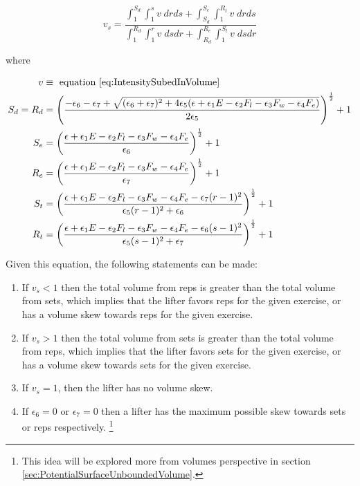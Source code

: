 \begin{minipage}{\textwidth}
	\begin{equation}
	   \label{eq:BasicSurfaceVolumeSkew}
	   v_s=\frac{
	   	\int_{1}^{S_d}\int_{1}^{s}v\;drds+
	   	\int_{S_d}^{S_e}\int_{1}^{R_t}v\;drds
	   }{
	   	\int_{1}^{R_d}\int_{1}^{r}v\;dsdr+
	   	\int_{R_d}^{R_e}\int_{1}^{S_t}v\;dsdr
	   }
	\end{equation}
	\centerline{where}
	\begin{equation*}
		\begin{split}
			v & \equiv \text{ equation \ref{eq:IntensitySubedInVolume}} \\
			S_d=R_d & =\left(
				\frac{
	   				-\epsilon_6-\epsilon_7+\sqrt{
	   					(\epsilon_6+\epsilon_7)^2+
	   					4\epsilon_5(
	   						\epsilon+
	   						\epsilon_1E-
	   						\epsilon_2F_l-
	   						\epsilon_3F_w-
	   						\epsilon_4F_e
	   					)
	   				}
	   			}{
	   				2\epsilon_5
			   	}\right)^{\frac{1}{2}} +1 \\
			S_e & =\left(
				\frac{
					\epsilon+
					\epsilon_1E-
					\epsilon_2F_l-
					\epsilon_3F_w-
					\epsilon_4F_e
				}{
					\epsilon_6
				}
			\right)^{\frac{1}{2}}+1 \\
			R_e & =\left(
				\frac{
					\epsilon+
					\epsilon_1E-
					\epsilon_2F_l-
					\epsilon_3F_w-
					\epsilon_4F_e
				}{
					\epsilon_7
				}
			\right)^{\frac{1}{2}}+1 \\
			S_t & =\left(
				\frac{
					\epsilon+
					\epsilon_1E-
					\epsilon_2F_l-
					\epsilon_3F_w-
					\epsilon_4F_e-
					\epsilon_7(r-1)^2		
				}{
					\epsilon_5(r-1)^2+
					\epsilon_6
				}
			\right)^{\frac{1}{2}}+1 \\
			R_t & =\left(
				\frac{
					\epsilon+
					\epsilon_1E-
					\epsilon_2F_l-
					\epsilon_3F_w-
					\epsilon_4F_e-
					\epsilon_6(s-1)^2		
				}{
					\epsilon_5(s-1)^2+
					\epsilon_7
				}
			\right)^{\frac{1}{2}}+1 \\
		\end{split}
	\end{equation*}
\end{minipage}

Given this equation, the following statements can be made:

\begin{enumerate}
    \item If $v_s<1$ then the total volume from reps is greater than the total volume from sets, which implies that the lifter favors reps for the given exercise, or has a volume skew towards reps for the given exercise.
    \item If $v_s>1$ then the total volume from sets is greater than the total volume from reps, which implies that the lifter favors sets for the given exercise, or has a volume skew towards sets for the given exercise.
    \item If $v_s=1$, then the lifter has no volume skew.
    \item If $\epsilon_6=0$ or $\epsilon_7=0$ then a lifter has the maximum possible skew towards sets or reps respectively. \footnote{This idea will be explored more from volumes perspective in section \ref{sec:PotentialSurfaceUnboundedVolume}.}
\end{enumerate}

